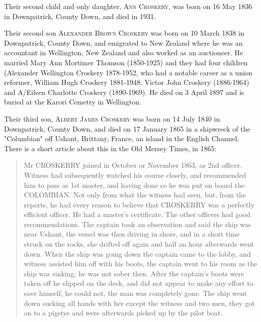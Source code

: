 Their second child and only daughter, \textsc{Ann Croskery}, was born on 16 May 1836 in Downpatrick, County Down, and died in 1931. 

Their second son \textsc{Alexander Brown Croskery} was born on 10 March 1838 in	Downpatrick, County Down, and emigrated to New Zealand where he was an accountant in Wellington, New Zealand and also worked as an auctioneer.  He married Mary Ann Mortimer Thomson (1850-1925) and they had four children (Alexander Wellington Croskery 1878-1952, who had a notable career as a union reformer, William Hugh Croskery 1881-1948, Victor John Croskery (1886-1964) and A/Eileen Charlotte Croskery (1890-1969). He died on 3 April 1897 and is buried at the Karori Cemetry in Wellington.

Their third son, \textsc{Albert James Croskery} was born on	14 July 1840 in	Downpatrick, County Down, and died on 17 January 1865 in a shipwreck of the "Columbian" off Ushant, Brittany, France, an island in the English Channel. There is a short article about this in the Old Mersey Times, in 1865:
\begin{quotation}
Mr CROSKERRY joined in October or November 1863, as 2nd officer. Witness had subsequently watched his course closely, and recommended him to pass as 1st master, and having done so he was put on board the COLOMBIAN. Not only from what the witness had seen, but, from the reports, he had every reason to believe that CROSKERRY was a perfectly efficient officer. He had a master's certificate. The other officers had good recommendations.
The captain took an observation and said the ship was near Ushant, the vessel was then driving in shore, and in a short time struck on the rocks, she drifted off again and half an hour afterwards went down. When the ship was going down the captain came to the lobby, and witness assisted him off with his boots, the captain went to his room as the ship was sinking, he was not sober then. After the captain's boots were taken off he slipped on the deck, and did not appear to make any effort to save himself, he could not, the man was completely gone. The ship went down sucking all hands with her except the witness and two men, they got on to a pigstye and were afterwards picked up by the pilot boat.
\end{quotation}

